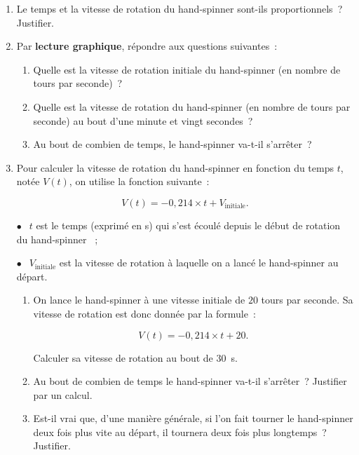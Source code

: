 \begin{enumerate}
     \item Le temps et la vitesse de rotation du \og hand-spinner \fg{} sont-ils proportionnels~? Justifier.
     \item Par \textbf{lecture graphique}, répondre aux questions suivantes~:
     \begin{enumerate}[label=\alph*.]
          \item Quelle est la vitesse de rotation initiale du \og hand-spinner \fg{} (en nombre de tours par seconde)~?
          \item Quelle est la vitesse de rotation du \og hand-spinner \fg{} (en nombre de tours par seconde) au bout d'une minute et vingt secondes~?
          \item Au bout de combien de temps, le \og hand-spinner \fg{} va-t-il s'arrêter~?
     \end{enumerate}
     \item  Pour calculer la vitesse de rotation du \og hand-spinner \fg{} en fonction du temps $t$, notée $V(t)$, on utilise la fonction suivante~:
     \par
     \[V(t) = - 0,214 \times t + V_{\text{initiale}}.\]
     \par
     $\bullet~~$ $t$ est le temps (exprimé en s) qui s'est écoulé depuis le début de rotation du \og hand-spinner \fg{}~;
     \par
     $\bullet~~$ $V_{\text{initiale}}$ est la vitesse de rotation à laquelle on a lancé le \og hand-spinner \fg{} au départ.
     \begin{enumerate}[label=\alph*.]
          \item On lance le \og hand-spinner \fg{} à une vitesse initiale de $20$ tours par seconde. Sa vitesse de rotation est donc donnée par la formule~:
          \par
          \[V(t) = - 0,214 \times t + 20.\]
          \par
          Calculer sa vitesse de rotation au bout de $30$~s.
          \item Au bout de combien de temps le hand-spinner va-t-il s'arrêter~? Justifier par un calcul.
          \item Est-il vrai que, d'une manière générale, si l'on fait tourner le hand-spinner deux fois plus vite au départ, il tournera deux fois plus longtemps~? Justifier.
     \end{enumerate}
\end{enumerate}
